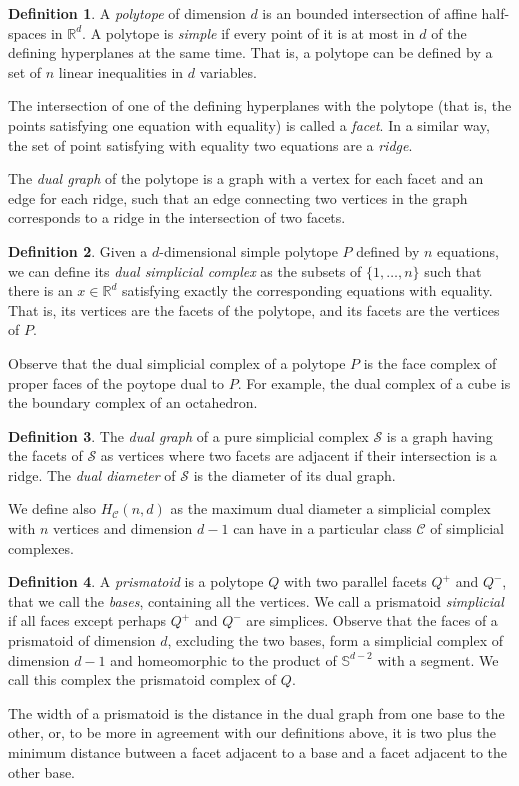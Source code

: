 \documentclass[12pt,a4paper]{article}
\theoremstyle{plain}
\theoremstyle{definition}
\newtheorem{definition}{Definition}
\begin{document}
\begin{definition}
  A \emph{polytope} of dimension $d$ is an bounded intersection of affine half-spaces in $\mathbb{R}^d$. A polytope is \emph{simple} if every point of it is at most in $d$ of the defining hyperplanes at the same time. That is, a polytope can be defined by a set of $n$ linear inequalities in $d$ variables.
  
  The intersection of one of the defining hyperplanes with the polytope (that is, the points satisfying one equation with equality) is called a \emph{facet}. In a similar way, the set of point satisfying with equality two equations are a \emph{ridge}.
  
  The \emph{dual graph} of the polytope is a graph with a vertex for each facet and an edge for each ridge, such that an edge connecting two vertices in the graph corresponds to a ridge in the intersection of two facets.
\end{definition}

\begin{definition}
  Given a $d$-dimensional simple polytope $P$ defined by $n$ equations, we can define its \emph{dual simplicial complex} as the subsets of $\{1,\dots,n\}$ such that there is an $x\in\mathbb{R}^d$ satisfying exactly the corresponding equations with equality. That is, its vertices are the facets of the polytope, and its facets are the vertices of $P$. 
\end{definition}

Observe that the dual simplicial complex of a polytope $P$ is the face complex of proper faces of the poytope dual to $P$. For example, the dual complex of a cube is the boundary complex of an octahedron.

\begin{definition}
  The \emph{dual graph} of a pure simplicial complex $\mathcal{S}$ is a graph having the facets of $\mathcal{S}$ as vertices where two facets are adjacent if their intersection is a ridge. The \emph{dual diameter} of $\mathcal{S}$ is the diameter of its dual graph.

  We define also $H_\mathcal{C}(n,d)$ as the maximum dual diameter a simplicial complex with $n$ vertices and dimension $d-1$ can have in a particular class $\mathcal{C}$ of simplicial complexes.
\end{definition}

\begin{definition}
  A \emph{prismatoid} is a polytope $Q$ with two parallel facets $Q^+$ and $Q^-$, that we call the \emph{bases}, containing all the vertices. We call a prismatoid \emph{simplicial} if all faces except perhaps $Q^+$ and $Q^-$ are simplices. Observe that the faces of a prismatoid of dimension $d$, excluding the two bases, form a simplicial complex of dimension $d-1$ and homeomorphic to the product of $\mathbb{S}^{d-2}$ with a segment. We call this complex the prismatoid complex of $Q$.
  
  The width of a prismatoid is the distance in the dual graph from one base to the other, or, to be more in agreement with our definitions above, it is two plus the minimum distance butween a facet adjacent to a base and a facet adjacent to the other base.
\end{definition}
\end{document}
